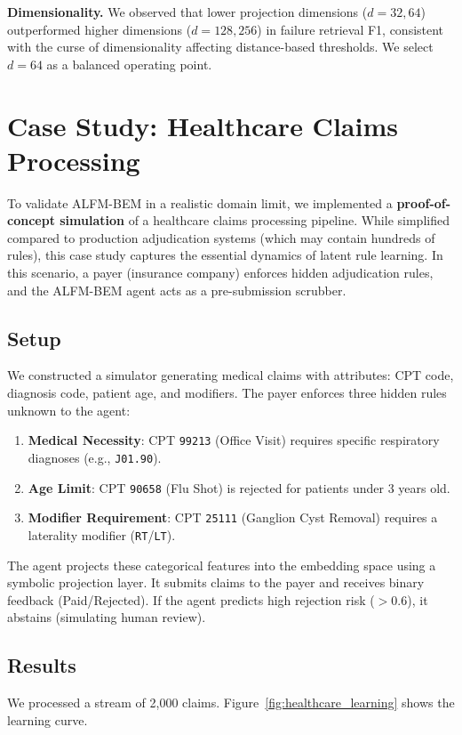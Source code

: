 \documentclass[twoside,11pt]{article}
\begin{document}
\textbf{Dimensionality.} We observed that lower projection dimensions ($d=32, 64$) outperformed higher dimensions ($d=128, 256$) in failure retrieval F1, consistent with the curse of dimensionality affecting distance-based thresholds. We select $d=64$ as a balanced operating point.

\section{Case Study: Healthcare Claims Processing}
\label{sec:case_study}

To validate ALFM-BEM in a realistic domain limit, we implemented a \textbf{proof-of-concept simulation} of a healthcare claims processing pipeline. While simplified compared to production adjudication systems (which may contain hundreds of rules), this case study captures the essential dynamics of latent rule learning. In this scenario, a payer (insurance company) enforces hidden adjudication rules, and the ALFM-BEM agent acts as a pre-submission scrubber.

\subsection{Setup}
We constructed a simulator generating medical claims with attributes: CPT code, diagnosis code, patient age, and modifiers. The payer enforces three hidden rules unknown to the agent:
\begin{enumerate}
    \item \textbf{Medical Necessity}: CPT \texttt{99213} (Office Visit) requires specific respiratory diagnoses (e.g., \texttt{J01.90}).
    \item \textbf{Age Limit}: CPT \texttt{90658} (Flu Shot) is rejected for patients under 3 years old.
    \item \textbf{Modifier Requirement}: CPT \texttt{25111} (Ganglion Cyst Removal) requires a laterality modifier (\texttt{RT}/\texttt{LT}).
\end{enumerate}

The agent projects these categorical features into the embedding space using a symbolic projection layer. It submits claims to the payer and receives binary feedback (Paid/Rejected). If the agent predicts high rejection risk ($>0.6$), it abstains (simulating human review).

\subsection{Results}
We processed a stream of 2,000 claims. Figure~\ref{fig:healthcare_learning} shows the learning curve.
\end{document}
